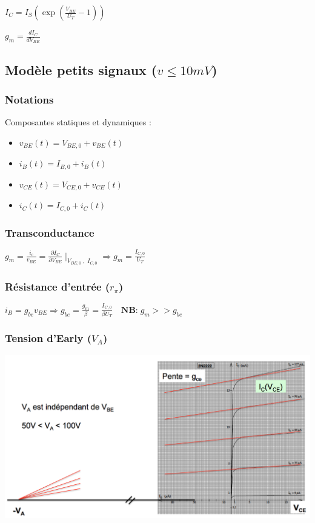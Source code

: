\documentclass[]{article}
\begin{document}
$I_C = I_S(\exp{(\frac{V_{BE}}{U_T}-1)})$

$g_m = \frac{dI_C}{dV_{BE}}$

\subsection{Modèle petits signaux ($v \le 10 mV$)}
\subsubsection{Notations}
Composantes statiques et dynamiques :
\begin{itemize}
\item $ v_{BE}(t) = V_{BE,0} + v_{BE}(t) $
\item $ i_B(t) = I_{B,0} + i_B(t)$
\item $ v_{CE}(t) =  V_{CE,0} + v_{CE}(t) $
\item $ i_C(t) = I_{C,0} + i_C(t) $ 
\end{itemize}

\subsubsection{Transconductance}
$ g_m = \frac{i_c}{v_{BE}} = \frac{\partial I_C}{\partial V_{BE}}\mid_{V_{BE,0}\;,\;I_{C,0}} \Rightarrow g_m = \frac{I_{C,0}}{U_T}$

\subsubsection{Résistance d'entrée ($r_\pi$)}
$i_B = g_{be}v_{BE} \Rightarrow g_{be} = \frac{g_m}{\beta} = \frac{I_{C,0}}{\beta U_T} \quad \textbf{NB:} \; g_m >> g_{be}$

\subsubsection{Tension d'Early ($V_A$)}
\includegraphics[scale=0.3]{early}
\end{document}
